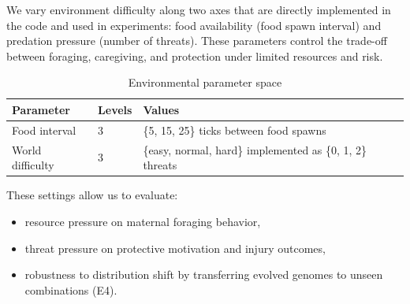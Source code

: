 We vary environment difficulty along two axes that are directly implemented in the code and used in experiments: food availability (food spawn interval) and predation pressure (number of threats). These parameters control the trade-off between foraging, caregiving, and protection under limited resources and risk.

\begin{table}[H]
\centering
\caption{Environmental parameter space}
\begin{tabular}{lll}
\toprule
Parameter & Levels & Values \\ 
\midrule
Food interval & 3 & \{5, 15, 25\} ticks between food spawns \\
World difficulty & 3 & \{easy, normal, hard\} implemented as \{0, 1, 2\} threats \\
\bottomrule
\end{tabular}
\label{tab:parameters}
\end{table}

These settings allow us to evaluate:
\begin{itemize}
    \item resource pressure on maternal foraging behavior,
    \item threat pressure on protective motivation and injury outcomes,
    \item robustness to distribution shift by transferring evolved genomes to unseen combinations (E4).
\end{itemize}





